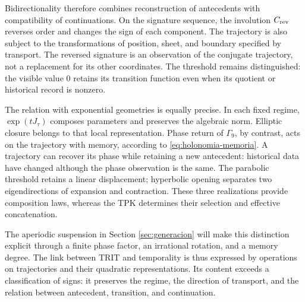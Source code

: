 Bidirectionality therefore combines reconstruction of antecedents with
compatibility of continuations. On the signature sequence, the involution
\(C_{\rm rev}\) reverses order and changes the sign of each component.
The trajectory is also subject to the transformations of position, sheet,
and boundary specified by transport. The reversed signature is an
observation of the conjugate trajectory, not a replacement for its other
coordinates. The threshold remains distinguished: the visible value
\(0\) retains its transition function even when its quotient or
historical record is nonzero.

The relation with exponential geometries is equally precise. In each
fixed regime, \(\exp(tJ_\tau)\) composes parameters and preserves the
algebraic norm. Elliptic closure belongs to that local representation.
Phase return of \(\Gamma_9\), by contrast, acts on the trajectory
with memory, according to \eqref{eq:holonomia-memoria}. A trajectory
can recover its phase while retaining a new antecedent: historical data
have changed although the phase observation is the same. The parabolic
threshold retains a linear displacement; hyperbolic opening separates
two eigendirections of expansion and contraction. These three
realizations provide composition laws, whereas the TPK determines their
selection and effective concatenation.

The aperiodic suspension in Section \ref{sec:generacion} will make this
distinction explicit through a finite phase factor, an irrational rotation,
and a memory degree. The link between TRIT and temporality is thus
expressed by operations on trajectories and their quadratic representations.
Its content exceeds a classification of signs: it preserves the regime,
the direction of transport, and the relation between antecedent,
transition, and continuation.
